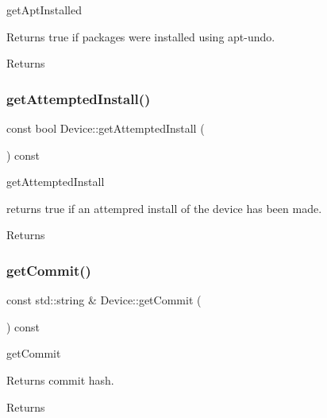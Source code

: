 get\+Apt\+Installed 

Returns true if packages were installed using apt-\/undo. \begin{DoxyReturn}{Returns}

\end{DoxyReturn}
\mbox{\label{classDevice_a068c25d48712783fd0dc759d4505c615}} 
\subsubsection{\texorpdfstring{get\+Attempted\+Install()}{getAttemptedInstall()}}
{\footnotesize\ttfamily const bool Device\+::get\+Attempted\+Install (\begin{DoxyParamCaption}{ }\end{DoxyParamCaption}) const}



get\+Attempted\+Install 

returns true if an attempred install of the device has been made. \begin{DoxyReturn}{Returns}

\end{DoxyReturn}
\mbox{\label{classDevice_ae5b04fdd1bf82d2dba2ec249e92e4da5}} 
\subsubsection{\texorpdfstring{get\+Commit()}{getCommit()}}
{\footnotesize\ttfamily const std\+::string \& Device\+::get\+Commit (\begin{DoxyParamCaption}{ }\end{DoxyParamCaption}) const}



get\+Commit 

Returns commit hash. \begin{DoxyReturn}{Returns}

\end{DoxyReturn}
\mbox{\label{classDevice_a6ba1792dd4f33f99e7b3ff97c4fae153}} 
